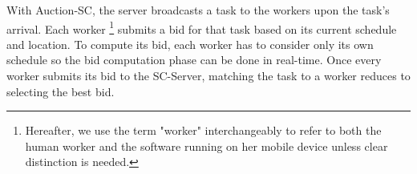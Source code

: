 With Auction-SC, the server broadcasts a task to the workers upon the task's arrival. Each worker \footnote{Hereafter, we use the term "worker" interchangeably to refer to both the human worker and the software running on her mobile device unless clear distinction is needed.} submits a bid for that task based on its current schedule and location. To compute its bid, each worker has to consider only its own schedule so the bid computation phase can be done in real-time. Once every worker submits its bid to the SC-Server, matching the task to a worker reduces to selecting the best bid.




